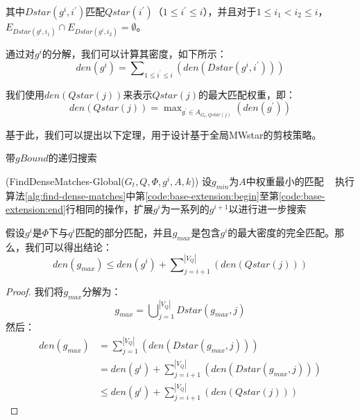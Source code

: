 其中$Dstar(g^i, i^\prime)$匹配$Qstar(i^\prime)$（$1 \leq i^\prime \leq i$），并且对于$1 \leq i_1 < i_2 \leq i$，$E_{Dstar(g^i, i_1)} \cap E_{Dstar(g^i, i_2)} = \emptyset$。

通过对$g^i$的分解，我们可以计算其密度，如下所示：
\[
	den(g^i) = \sum\nolimits_{1\leq i^\prime\leq i} \left(den(Dstar(g^i,i^\prime))\right)
\] 

我们使用$den(Qstar(j))$来表示$Qstar(j)$的最大匹配权重，即：
\[
	den(Qstar(j)) = \max\nolimits_{g^\prime \in A_{G_t, Qstar(j)}} \left(den(g^\prime)\right)
\]


基于此，我们可以提出以下定理，用于设计基于全局MWstar的剪枝策略。

\begin{algorithm}[h!]
    \small
    \caption{带$gBound$的递归搜索}
    \label{alg:find-dense-matches-gBound}
    \iFunc(FindDenseMatches-Global{(}$G_t, Q, \Phi, g^i, A, k${)})
    {
    设$g_{min}$为$A$中权重最小的匹配 \
    执行算法\ref{alg:find-dense-matches}中第\ref{code:base-extension:begin}至第\ref{code:base-extension:end}行相同的操作，扩展$g^i$为一系列的$g^{i+1}$以进行进一步搜索 \\
    \Return
    }
\end{algorithm}


\begin{theorem} \label{theorem:global-mwstar}
假设$g^i$是$\Phi$下与$q^i$匹配的部分匹配，并且$g_{max}$是包含$g^i$的最大密度的完全匹配。那么，我们可以得出结论：
\[
	den(g_{max}) \leq den(g^i) + \sum\nolimits_{j=i+1}^{|V_Q|} \left(den(Qstar(j))\right)
\]

\end{theorem}

\begin{proof}
我们将$g_{max}$分解为：
\[
	g_{max} =   \bigcup\nolimits_{j=1}^{|V_Q|} Dstar(g_{max}, j)
\]
然后：
\begin{equation*}
    \begin{aligned}
      den(g_{max}) & =  \sum\nolimits_{j=1}^{|V_Q|} \left( den(Dstar(g_{max}, j)) \right)  \\
        & =  den(g^i) + \sum\nolimits_{j=i+1}^{|V_Q|} \left( den(Dstar(g_{max}, j)) \right) \\
        & \leq den(g^i) + \sum\nolimits_{j=i+1}^{|V_Q|} \left( den(Qstar(j)) \right) 
    \end{aligned}
  \end{equation*}
  \end{proof}

